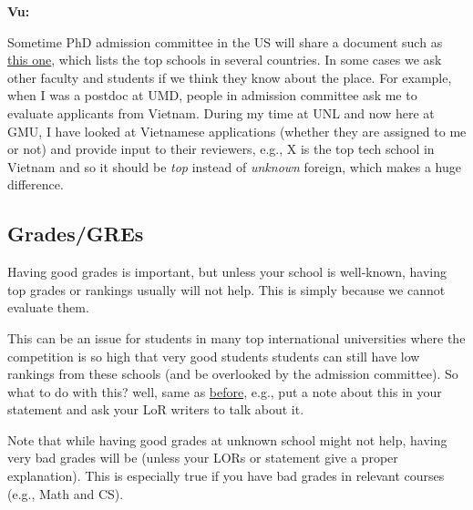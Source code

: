 \documentclass[11pt]{article}
\newenvironment{commentbox}[1][]{
\small
    \begin{cbox}
    \textbf{#1} 
 }{
   \end{cbox}
}
\newcommand{\red}[1]{{\color{red}{#1}}}
\begin{document}
\begin{commentbox}[Vu:]
Sometime PhD admission committee in the US will share a document such as \href{https://github.com/dynaroars/dynaroars.github.io/wiki/Foreign-Top-Schools}{this one}, which lists the top schools in several countries. In some cases we ask other faculty and students if we think they know about the place.  For example, when I was a postdoc at UMD, people in admission committee ask me to evaluate applicants from Vietnam.  During my time at UNL and now here at GMU, I have looked at Vietnamese applications (whether they are assigned to me or not) and provide input to their reviewers, e.g., X is the top tech school in Vietnam and so it should be \emph{top} instead of \emph{unknown} foreign, which makes a huge difference.
\end{commentbox}



\subsection{Grades/GREs}\label{sec:grades}


Having good grades is important, but unless your school is well-known, having top grades or rankings
usually will not help. This is simply because we cannot evaluate them.

This can be an issue for students in many top international universities where the competition is so high that very good students students can still have low rankings from these schools (and be overlooked by the admission committee).
So what to do with this? well, same as \hyperref[sec:your-school]{before}, e.g., put a note about this in your statement and ask your LoR writers to talk about it.

Note that while having good grades at unknown school might not help,
having very bad grades will be \red{red flag} (unless your LORs or
statement give a proper explanation). This is especially true if you
have bad grades in relevant courses (e.g., Math and CS).
\end{document}

